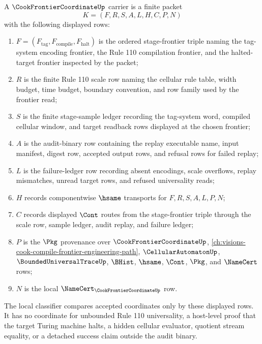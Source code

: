 \begin{definition}
\label{def:cook-frontier-coordinate-carrier}
A $\CookFrontierCoordinateUp$ carrier is a finite packet
$$
K=(F,R,S,A,L,H,C,P,N)
$$
with the following displayed rows:
\begin{enumerate}
\item $F=(F_{\mathrm{tag}},F_{\mathrm{compile}},F_{\mathrm{halt}})$ is the ordered stage-frontier triple naming the tag-system encoding frontier, the Rule 110 compilation frontier, and the halted-target frontier inspected by the packet;
\item $R$ is the finite Rule 110 scale row naming the cellular rule table, width budget, time budget, boundary convention, and row family used by the frontier read;
\item $S$ is the finite stage-sample ledger recording the tag-system word, compiled cellular window, and target readback rows displayed at the chosen frontier;
\item $A$ is the audit-binary row containing the replay executable name, input manifest, digest row, accepted output rows, and refusal rows for failed replay;
\item $L$ is the failure-ledger row recording absent encodings, scale overflows, replay mismatches, unread target rows, and refused universality reads;
\item $H$ records componentwise $\hsame$ transports for $F,R,S,A,L,P,N$;
\item $C$ records displayed $\Cont$ routes from the stage-frontier triple through the scale row, sample ledger, audit replay, and failure ledger;
\item $P$ is the $\Pkg$ provenance over $\CookFrontierCoordinateUp$, \autoref{ch:visions-cook-compile-frontier-engineering-path}, $\CellularAutomatonUp$, $\BoundedUniversalTraceUp$, $\BHist$, $\hsame$, $\Cont$, $\Pkg$, and $\NameCert$ rows;
\item $N$ is the local $\NameCert_{\CookFrontierCoordinateUp}$ row.
\end{enumerate}
The local classifier compares accepted coordinates only by these displayed rows. It has no coordinate for unbounded Rule 110 universality, a host-level proof that the target Turing machine halts, a hidden cellular evaluator, quotient stream equality, or a detached success claim outside the audit binary.
\end{definition}

